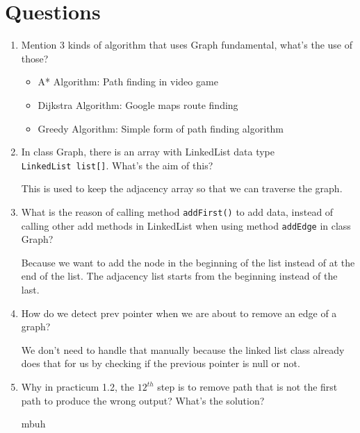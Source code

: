 \documentclass[12pt,titlepage]{article}
\begin{document}
\section{Questions}
\begin{enumerate}
    \item {
        Mention 3 kinds of algorithm that uses Graph fundamental, what's the use of those?
        \begin{itemize}
            \item A* Algorithm: Path finding in video game
            \item Dijkstra Algorithm: Google maps route finding
            \item Greedy Algorithm: Simple form of path finding algorithm
        \end{itemize}
    }
    \item {
        In class Graph, there is an array with LinkedList data type\\
        \texttt{LinkedList list[]}. What's the aim of this?

        This is used to keep the adjacency array so that we can traverse the graph.
    }
    \item {
        What is the reason of calling method \texttt{addFirst()} to add data, instead of calling other add methods in LinkedList when using method \texttt{addEdge} in
        class Graph?

        Because we want to add the node in the beginning of the list instead of at the end of the list.
        The adjacency list starts from the beginning instead of the last.
    }
    \item {
        How do we detect prev pointer when we are about to remove an edge of a graph?

        We don't need to handle that manually because the linked list class already does that for us
        by checking if the previous pointer is null or not.
    }
    \item {
        Why in practicum 1.2, the $12^{th}$ step is to remove path that is not the first path to produce the wrong output? What's the solution?

        mbuh
    }
\end{enumerate}
\end{document}
